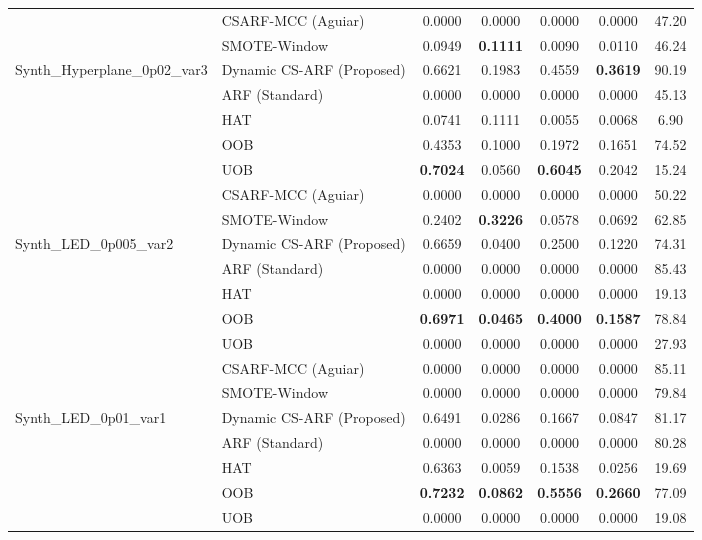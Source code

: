 \begin{longtable}{|l|l|c|c|c|c|c|}
 & CSARF-MCC (Aguiar) & 0.0000 & 0.0000 & 0.0000 & 0.0000 & 47.20 \\ \cline{2-7}
 & SMOTE-Window & 0.0949 & \textbf{0.1111} & 0.0090 & 0.0110 & 46.24 \\ \hline
\multirow{7}{*}{Synth_Hyperplane_0p02_var3} & Dynamic CS-ARF (Proposed) & 0.6621 & 0.1983 & 0.4559 & \textbf{0.3619} & 90.19 \\ \cline{2-7}
 & ARF (Standard) & 0.0000 & 0.0000 & 0.0000 & 0.0000 & 45.13 \\ \cline{2-7}
 & HAT & 0.0741 & 0.1111 & 0.0055 & 0.0068 & 6.90 \\ \cline{2-7}
 & OOB & 0.4353 & 0.1000 & 0.1972 & 0.1651 & 74.52 \\ \cline{2-7}
 & UOB & \textbf{0.7024} & 0.0560 & \textbf{0.6045} & 0.2042 & 15.24 \\ \cline{2-7}
 & CSARF-MCC (Aguiar) & 0.0000 & 0.0000 & 0.0000 & 0.0000 & 50.22 \\ \cline{2-7}
 & SMOTE-Window & 0.2402 & \textbf{0.3226} & 0.0578 & 0.0692 & 62.85 \\ \hline
\multirow{7}{*}{Synth_LED_0p005_var2} & Dynamic CS-ARF (Proposed) & 0.6659 & 0.0400 & 0.2500 & 0.1220 & 74.31 \\ \cline{2-7}
 & ARF (Standard) & 0.0000 & 0.0000 & 0.0000 & 0.0000 & 85.43 \\ \cline{2-7}
 & HAT & 0.0000 & 0.0000 & 0.0000 & 0.0000 & 19.13 \\ \cline{2-7}
 & OOB & \textbf{0.6971} & \textbf{0.0465} & \textbf{0.4000} & \textbf{0.1587} & 78.84 \\ \cline{2-7}
 & UOB & 0.0000 & 0.0000 & 0.0000 & 0.0000 & 27.93 \\ \cline{2-7}
 & CSARF-MCC (Aguiar) & 0.0000 & 0.0000 & 0.0000 & 0.0000 & 85.11 \\ \cline{2-7}
 & SMOTE-Window & 0.0000 & 0.0000 & 0.0000 & 0.0000 & 79.84 \\ \hline
\multirow{7}{*}{Synth_LED_0p01_var1} & Dynamic CS-ARF (Proposed) & 0.6491 & 0.0286 & 0.1667 & 0.0847 & 81.17 \\ \cline{2-7}
 & ARF (Standard) & 0.0000 & 0.0000 & 0.0000 & 0.0000 & 80.28 \\ \cline{2-7}
 & HAT & 0.6363 & 0.0059 & 0.1538 & 0.0256 & 19.69 \\ \cline{2-7}
 & OOB & \textbf{0.7232} & \textbf{0.0862} & \textbf{0.5556} & \textbf{0.2660} & 77.09 \\ \cline{2-7}
 & UOB & 0.0000 & 0.0000 & 0.0000 & 0.0000 & 19.08 \\ \cline{2-7}

\end{longtable}
